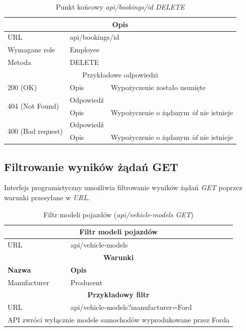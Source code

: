 \documentclass[eng,printmode,openany]{mgr}
\begin{document}
\begin{table}[H]
	\caption{Punkt końcowy \textit{api/bookings/id DELETE}}
	\begin{tabularx}{\textwidth}{|l|l|X|}
		\hline
		\multicolumn{3}{|c|}{Opis}                         						\\ \hline
		URL                       & \multicolumn{2}{l|}{api/bookings/id} 	\\ \hline
		Wymagane role             & \multicolumn{2}{l|}{Employee} \\ \hline
		Metoda                    & \multicolumn{2}{l|}{DELETE} 				\\ \hline
		\multicolumn{3}{|c|}{ Przykładowe odpowiedzi}                   		\\ \hline
		200 (OK)			& Opis         	& Wypożyczenie zostało usunięte	        \\ \hline
		\multirow{2}{*}{404 (Not Found)} 	& Odpowiedź     &    \\ \cline{2-3} 
		& Opis          & Wypożyczenie o żądanym \textit{id} nie istnieje  							        \\ \hline
		\multirow{2}{*}{400 (Bad request)} 	& Odpowiedź     &    \\ \cline{2-3} 
		& Opis          & Wypożyczenie o żądanym \textit{id} nie istnieje  							        \\ \hline                            
	\end{tabularx}
\end{table}

\subsection{Filtrowanie wyników żądań GET}
Interfejs programistyczny umożliwia filtrowanie wyników żądań \textit{GET} poprzez warunki przesyłane w \textit{URL}.
\begin{table}[H]
	\caption{Filtr modeli pojazdów (\textit{api/vehicle-models GET})}
	\begin{tabularx}{\textwidth}{|l|X|}
		\hline                                       							
		\multicolumn{2}{|c|}{\textbf{Filtr modeli pojazdów}}  							        \\ \hline
		URL                 & api/vehicle-models     							             	\\ \hline
		\multicolumn{2}{|c|}{\textbf{Warunki}}     												\\ \hline
		\textbf{Nazwa}      & \textbf{Opis}              										\\ \hline
		Manufacturer        & Producent         												\\ \hline
		\multicolumn{2}{|c|}{\textbf{Przykładowy filtr}}										\\ \hline
		URL                 & api/vehicle-models?manufacturer=Ford								\\ \hline
		\multicolumn{2}{|l|}{API zwróci wyłącznie modele samochodów wyprodukowane przez Forda}	\\ \hline
	\end{tabularx}
\end{table}
\end{document}
